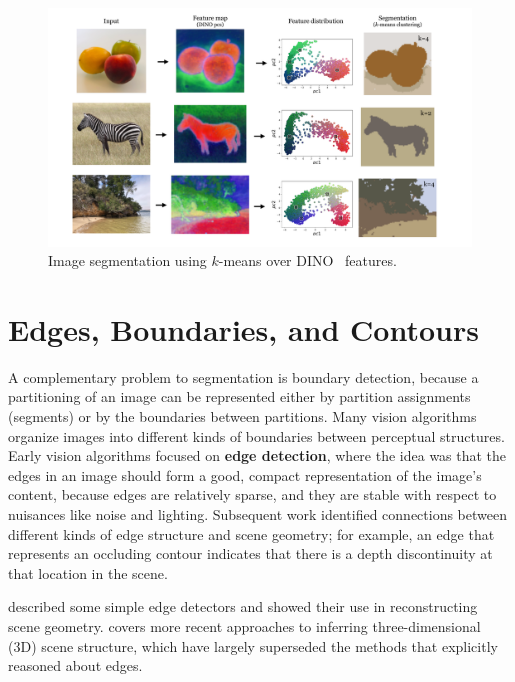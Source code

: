 
\begin{figure}[t]
    \centerline{
        \includegraphics[width=1.0\linewidth]{./figures/perceptual_organization/kmeans_dino.pdf}
    }
    \caption{Image segmentation using $k$-means over DINO~\cite{caron2021emerging} features.}
    \label{fig:perceptual_organization:kmeans_dino}
\end{figure}

\section{Edges, Boundaries, and Contours}
A complementary problem to segmentation is boundary detection, because a partitioning of an image can be represented either by partition assignments (segments) or by the boundaries between partitions. Many vision algorithms organize images into different kinds of boundaries between perceptual structures. Early vision algorithms focused on \textbf{edge detection}, where the idea was that the edges in an image should form a good, compact representation of the image's content, because edges are relatively sparse, and they are stable with respect to nuisances like noise and lighting. Subsequent work identified connections between different kinds of edge structure and scene geometry; for example, an edge that represents an occluding contour indicates that there is a depth discontinuity at that location in the scene.

\Chap{\ref{chapter:simplesystem}} described some simple edge detectors and showed their use in reconstructing scene geometry. \Chap{\ref{chapter:3D_single_view}} covers more recent approaches to inferring three-dimensional (3D) scene structure, which have largely superseded the methods that explicitly reasoned about edges.

